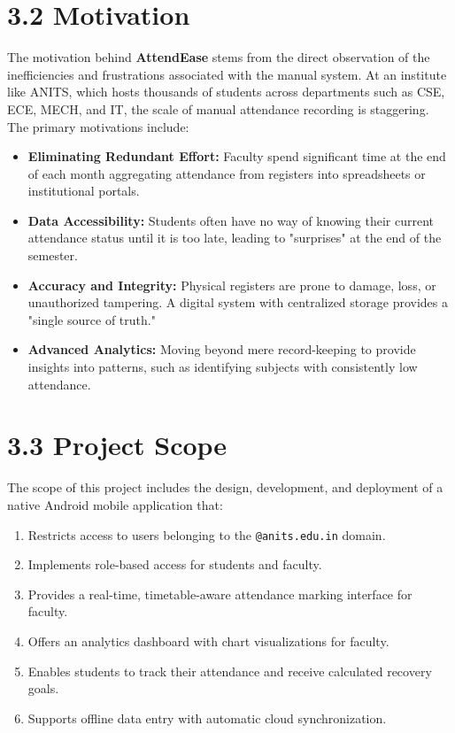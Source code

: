 \documentclass[12pt,a4paper]{report}
\begin{document}
\section*{3.2 Motivation}
The motivation behind \textbf{AttendEase} stems from the direct observation of the inefficiencies and frustrations associated with the manual system. At an institute like ANITS, which hosts thousands of students across departments such as CSE, ECE, MECH, and IT, the scale of manual attendance recording is staggering. The primary motivations include:
\begin{itemize}
    \item \textbf{Eliminating Redundant Effort:} Faculty spend significant time at the end of each month aggregating attendance from registers into spreadsheets or institutional portals.
    \item \textbf{Data Accessibility:} Students often have no way of knowing their current attendance status until it is too late, leading to "surprises" at the end of the semester.
    \item \textbf{Accuracy and Integrity:} Physical registers are prone to damage, loss, or unauthorized tampering. A digital system with centralized storage provides a "single source of truth."
    \item \textbf{Advanced Analytics:} Moving beyond mere record-keeping to provide insights into patterns, such as identifying subjects with consistently low attendance.
\end{itemize}

\section*{3.3 Project Scope}
The scope of this project includes the design, development, and deployment of a native Android mobile application that:
\begin{enumerate}
    \item Restricts access to users belonging to the \texttt{@anits.edu.in} domain.
    \item Implements role-based access for students and faculty.
    \item Provides a real-time, timetable-aware attendance marking interface for faculty.
    \item Offers an analytics dashboard with chart visualizations for faculty.
    \item Enables students to track their attendance and receive calculated recovery goals.
    \item Supports offline data entry with automatic cloud synchronization.
\end{enumerate}
\end{document}
